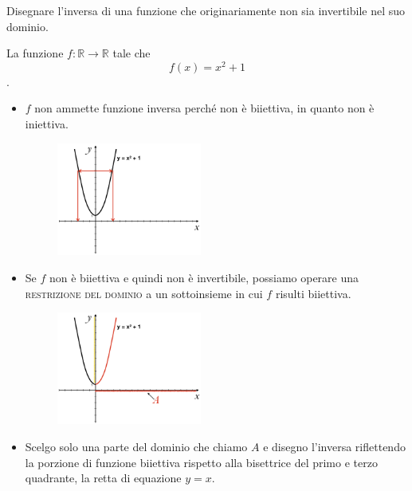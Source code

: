 \begin{esempio} Disegnare l'inversa di una funzione che originariamente non 
sia invertibile nel suo dominio. 

La funzione $f:\mathbb{R}\to\mathbb{R}$ tale che $$f(x)=x^2+1$$.
\begin{itemize}
  \item $f$ non ammette funzione inversa perché non è biiettiva, in 
quanto non è iniettiva.
  \begin{figure}[htpb!]
  \centering
  
\includegraphics[width=0.45\textwidth]{img/funz_14a.png} %
  
  
  \end{figure}
  \item Se $f$ non è biiettiva e quindi non è invertibile, possiamo 
operare una \textsc{restrizione del dominio} a un sottoinsieme in cui $f$ 
risulti biiettiva.
  \begin{figure}[htpb!]
  \centering
  
  
\includegraphics[width=0.45\textwidth]{img/funz_14b.png} %
  
  \end{figure}
  \item Scelgo solo una parte del dominio che chiamo $A$ e disegno 
l'inversa riflettendo la porzione di funzione biiettiva rispetto alla 
bisettrice del primo e terzo quadrante, la retta di equazione $y=x$.
  \begin{figure}[htpb!]
  \centering
  

\end{figure}
\end{itemize}
\end{esempio}
